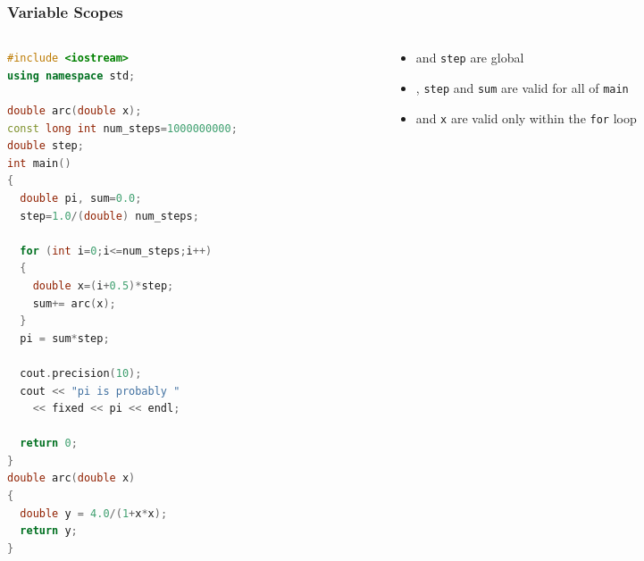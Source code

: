 \documentclass[xcolor=table,10pt,final]{beamer}
\begin{document}
\begin{frame}[fragile]
  \frametitle{Variable Scopes}
  \begin{columns}
    \begin{column}{0.5\textwidth}
  \begin{lstlisting}[language=C++,basicstyle=\scriptsize]
#include <iostream>
using namespace std;

double arc(double x);
const long int num_steps=1000000000;
double step;
int main()
{
  double pi, sum=0.0;
  step=1.0/(double) num_steps;

  for (int i=0;i<=num_steps;i++)
  {
    double x=(i+0.5)*step;
    sum+= arc(x);
  }
  pi = sum*step;

  cout.precision(10);
  cout << "pi is probably " 
    << fixed << pi << endl;

  return 0;
}
double arc(double x)
{
  double y = 4.0/(1+x*x);
  return y;
}
  \end{lstlisting}
\end{column}
\begin{column}{0.5\textwidth}
  \begin{itemize}
    \itemsep 0.3cm
    \item {\color{blue}{\tt num\_steps} and {\tt step} are global}
    \item {\color{green}{\tt pi}, {\tt step} and {\tt sum} are valid for all of {\tt main}}
    \item {\color{red}{\tt i} and {\tt x} are valid only within the {\tt for} loop}
  \end{itemize}
\end{column}
\end{columns}
\end{frame}
\end{document}
